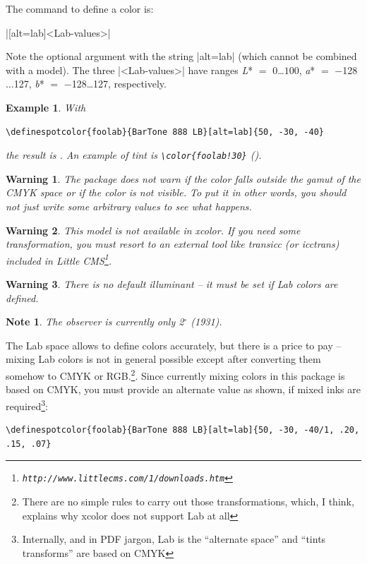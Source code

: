 \documentclass[a4paper]{ltxguide}
\def\showclr#1#{\testclr{#1}}
\def\testclr#1#2{{\fboxsep0pt\fbox{\colorbox#1{#2}{\phantom{,MM}}}}}
\newtheorem{warning}{Warning}
\newtheorem{note}{Note}
\newtheorem{example}{Example}
\begin{document}
The command to define a color is:
\begin{decl}
|[alt=lab]{<Lab-values>}|
\end{decl}
Note the optional argument with the string |alt=lab| (which cannot be
combined with a model). The three |<Lab-values>| have ranges
\textit{L}* $=$ $0$\ldots$100$, \textit{a}* $=$ $-$128$\ldots$127,
\textit{b}* $=$ $-$128{\ldots}127, respectively.

\begin{example}
  With
\begin{verbatim}
\definespotcolor{foolab}{BarTone 888 LB}[alt=lab]{50, -30, -40}
\end{verbatim}
the result is . An example of tint is
\verb|\color{foolab!30}| ().
\end{example}

\begin{warning}
  The package does not warn if the color falls outside the gamut of
  the CMYK space or if the color is not visible. To put it in
  other words, you should not just write some arbitrary values to see
  what happens.
\end{warning}

\begin{warning}
  This model is not available in \textsf{xcolor}. If you need some
  transformation, you must resort to an external tool like
  \textsf{transicc} (or \textsf{icctrans}) included in Little
  CMS\footnote{\texttt{http://www.littlecms.com/1/downloads.htm}}.
\end{warning}

\begin{warning}
  There is no default illuminant -- it must be set if Lab colors are
  defined.
\end{warning}

\begin{note}
  The observer is currently only 2$^\circ$ (1931).
\end{note}

The Lab space allows to define colors accurately, but there is a price
to pay -- mixing Lab colors is not in general possible except after
converting them somehow to CMYK or RGB.\footnote{There are no simple
rules to carry out those transformations, which, I think, explains why
\textsf{xcolor} does not support Lab at all}. Since currently mixing
colors in this package is based on CMYK, you must provide an alternate
value as shown, if mixed inks are required\footnote{Internally, and
in PDF jargon, Lab is the ``alternate space'' and ``tints transforms''
are based on CMYK}:
\begin{verbatim}
\definespotcolor{foolab}{BarTone 888 LB}[alt=lab]{50, -30, -40/1, .20, .15, .07}
\end{verbatim}
\end{document}
